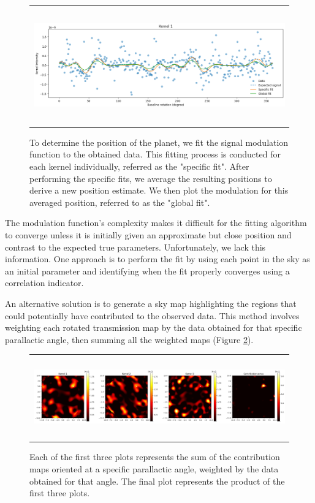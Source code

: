 \documentclass[]{spie}  %
\begin{document}
\begin{figure} [ht]
    \begin{center}
    \begin{tabular}{c}
    \includegraphics[height=5cm]{img/fit.png}
    \end{tabular}
    \end{center}
    \caption[fit] 
    {\label{fig:fit} 
    To determine the position of the planet, we fit the signal modulation function to the obtained data. This fitting process is conducted for each kernel individually, referred as the "specific fit". After performing the specific fits, we average the resulting positions to derive a new position estimate. We then plot the modulation for this averaged position, referred to as the "global fit".}
\end{figure}

The modulation function's complexity makes it difficult for the fitting algorithm to converge unless it is initially given an approximate but close position and contrast to the expected true parameters. Unfortunately, we lack this information. One approach is to perform the fit by using each point in the sky as an initial parameter and identifying when the fit properly converges using a correlation indicator.

An alternative solution is to generate a sky map highlighting the regions that could potentially have contributed to the observed data. This method involves weighting each rotated transmission map by the data obtained for that specific parallactic angle, then summing all the weighted maps (Figure \ref{fig:contribution_zone}).

\begin{figure} [ht]
    \begin{center}
    \begin{tabular}{c}
    \includegraphics[height=3.5cm]{img/contribution_zone.png}
    \end{tabular}
    \end{center}
    \caption[contribution_zone] 
    {\label{fig:contribution_zone} 
    Each of the first three plots represents the sum of the contribution maps oriented at a specific parallactic angle, weighted by the data obtained for that angle. The final plot represents the product of the first three plots.}
\end{figure}
\end{document}
